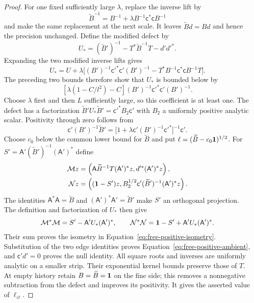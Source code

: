 \begin{proof}
For one fixed sufficiently large $\lambda$, replace the inverse lift by
\[
 \widetilde B^{-1}
 =B^{-1}+\lambda B^{-1}\mathsf c^*\mathsf cB^{-1}
\]
and make the same replacement at the next scale.
It leaves $\widetilde Bd=Bd$ and hence the precision unchanged.
Define the modified defect by
\[
 U_*=(\widetilde B')^{-1}
          -T^*\widetilde B^{-1}T-d'd'^*.
\]
Expanding the two modified inverse lifts gives
\[
 U_*=U+\lambda\bigl[
 (B')^{-1}\mathsf c'^*\mathsf c'(B')^{-1}
 -T^*B^{-1}\mathsf c^*\mathsf cB^{-1}T\bigr].
\]
The preceding two bounds therefore show that $U_*$ is bounded below by
\[
 [\lambda(1-C/l^2)-C]
 (B')^{-1}\mathsf c'^*\mathsf c'(B')^{-1}.
\]
Choose $\lambda$ first and then $L$ sufficiently large, so this
coefficient is at least one.  The defect has a factorization
$\widetilde B'U_*\widetilde B'=\mathsf c'^*B_2\mathsf c'$ with
$B_2$ a uniformly positive analytic scalar.  Positivity through zero
follows from
\[
 \mathsf c'(B')^{-1}\widetilde B'
 =\bigl[1+\lambda\mathsf c'(B')^{-1}\mathsf c'^*\bigr]^{-1}
   \mathsf c'.
\]
Choose $c_0$ below the common lower bound for $\widetilde B$ and put
$\ell=(\widetilde B-c_0\mathbf 1)^{1/2}$.
For $S'=\mathsf A'(\widetilde B')^{-1}(\mathsf A')^*$ define
\begin{align*}
 \mathcal Mz
 &=\left(\mathsf A\widetilde B^{-1}T(\mathsf A')^*z,
                       d'^*(\mathsf A')^*z\right),\\
 \mathcal Nz
 &=\left((\mathbf 1-S')z,
       B_2^{1/2}\mathsf c'(\widetilde B')^{-1}(\mathsf A')^*z\right).
\end{align*}
The identities $\mathsf A^*\mathsf A=\widetilde B$ and
$(\mathsf A')^*\mathsf A'=\widetilde B'$ make $S'$ an orthogonal
projection.  The definition and factorization of $U_*$ then give
\[
 \mathcal M^*\mathcal M
   =S'-\mathsf A'U_*(\mathsf A')^*,\qquad
 \mathcal N^*\mathcal N
   =\mathbf 1-S'+\mathsf A'U_*(\mathsf A')^*.
\]
Their sum proves the isometry in
Equation~\eqref{eq:free-positive-isometry}.  Substitution of the two
edge identities proves Equation~\eqref{eq:free-positive-ambient},
and $\mathsf c'd'=0$ proves the null identity.
All square roots and inverses are uniformly analytic on a smaller
strip.  Their exponential kernel bounds preserve those of $T$.
At empty history retain $B=\widetilde B=\mathbf 1$ on the fine side;
this removes a nonnegative subtraction from the defect and improves
its positivity.  It gives the asserted value of $\ell_{\varnothing}$.


\end{proof}
